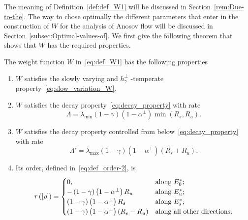 \documentclass[AHL,Unicode,longabstracts,published]{cedram}
\begin{document}
\begin{rema}
The meaning of Definition~\ref{def:def_W1} will be discussed in Section~\ref{rem:Due-to-the}. The way to chose optimally the different parameters that enter in the construction of $W$ for the analysis of Anosov flow will be discussed in Section~\ref{subsec:Optimal-values-of}. We first give the following theorem that shows that $W$ has the required properties.
\end{rema}

\begin{cBoxB}{}
\begin{theo}\label{thm:W}
The weight function $W$ in~\eqref{eq:def_W1} has the following properties
\begin{enumerate}
\item \label{enu:-satisfies--temperate-1}
$W$ satisfies the slowly varying and $h_{\gamma}^{\perp}$ -temperate property~\eqref{eq:slow_variation_W}.
\item \label{enu:-satisfies-decay-1}
$W$ satisfies the decay property~\eqref{eq:decay_property} with rate
\begin{equation}\label{eq:def_Lambda}
\Lambda=\lambda_{\min}\left(1-\gamma\right)\left(1-\alpha^{\perp}\right)\min\left(R_{s},R_{u}\right).
\end{equation}
\item \label{enu:-satisfies-decay-below}
$W$ satisfies the decay property controlled from below~\eqref{eq:decay_property} with rate
\begin{equation}\label{eq:lAMBDA_P}
\Lambda'=\lambda_{\max}\left(1-\gamma\right)\left(1-\alpha^{\perp}\right)\left(R_{s}+R_{u}\right).
\end{equation}
\item \label{enu:Its-order-is-1}
Its order, defined in~\eqref{eq:def_order-2}, is
\begin{equation}\label{eq:order_of_W1}
r\left(\left[\rho\right]\right)=
\begin{cases}
0, & \text{along \ensuremath{E_{0}^{*}}; }\\
-\left(1-\gamma\right)\left(1-\alpha^{\perp}\right)R_{u} & \text{along \ensuremath{E_{u}^{*}};}\\
\left(1-\gamma\right)\left(1-\alpha^{\perp}\right)R_{s} & \text{along \ensuremath{E_{s}^{*}};}\\
\left(1-\gamma\right)\left(1-\alpha^{\perp}\right)\left(R_{s}-R_{u}\right) & \text{along all other directions.}
\end{cases}
\end{equation}
\end{enumerate}
\end{theo}
\end{cBoxB}
\end{document}
